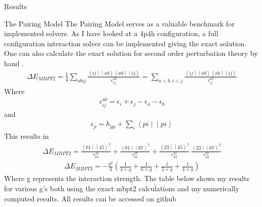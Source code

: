 \documentclass[twoside,english]{uiofysmaster}
\begin{document}
\begin{chapter}{Results}
	
	\begin{section}{The Pairing Model}
		The Pairing Model serves as a valuable benchmark for implemented solvers. As I have looked at a 4p4h configuration, a full configuration interaction solver can be implemented giving the exact solution. One can also calculate the exact solution for second order perturbation theory by hand \cite{Hjorth-Jensen2016}. 
		\begin{align}
			\Delta E_{MBPT2} = \frac{1}{4} \sum_{abij} \frac{\left<ij\middle|\middle|ab\right>\left<ab\middle|\middle|ij\right>}{\epsilon_{ij}^{ab}} = 
			\sum_{a<b,i<j} \frac{\left<ij\middle|\middle|ab\right>\left<ab\middle|\middle|ij\right>}{\epsilon_{ij}^{ab}}
		\end{align}
		Where 
		\begin{align}
			\epsilon_{ij}^{ab} = \epsilon_i + \epsilon_j - \epsilon_a - \epsilon_b
		\end{align}
		and
		\begin{align}
			\epsilon_p = h_{pp} + \sum_i \left<pi\middle|\middle|pi\right>
		\end{align}
		This results in
		\begin{align}
			\Delta E_{MBPT2} = \frac{\left<01\middle|\middle|45\right>^2}{\epsilon_{01}^{45} } + \frac{\left<01\middle|\middle|67\right>^2}{\epsilon_{01}^{67} }
							  +\frac{\left<23\middle|\middle|45\right>^2}{\epsilon_{23}^{45} } \ \frac{\left<23\middle|\middle|67\right>^2}{\epsilon_{23}^{67} }
		\end{align}
		\begin{align}
			\Delta E_{MBPT2} = -\frac{g^2}{4} \left( \frac{1}{4+g} + \frac{1}{6+g} + \frac{1}{2+g} + \frac{1}{4+g} \right)
		\end{align}
		Where g represents the interaction strength. The table below shows my results for various g's both using the exact mbpt2 calculations and my numerically computed results. All results can be accessed on github \cite{WholmenGithub}


\end{section}
\end{chapter}
\end{document}
